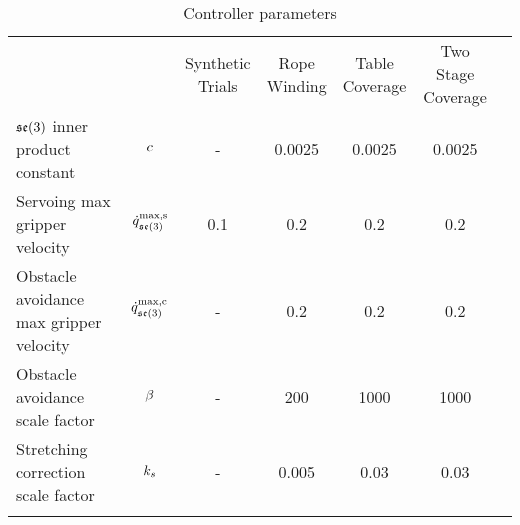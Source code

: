 \begin{table}[h]
\centering
\caption{Controller parameters}
\label{tab:controller_param_table}
\begin{tabular}{lcccccc}
\hline\noalign{\smallskip}
                                                        &                       & \makecell{Synthetic\\Trials} 
                                                                                & \makecell{Rope\\Winding}
                                                                                & \makecell{Table\\Coverage}
                                                                                & \makecell{Two Stage\\Coverage} \\
\noalign{\smallskip}\hline\noalign{\smallskip}
\makecell[l]{$\mathfrak{se}(3)$ inner\\product constant}      & $c$        &   - & 0.0025 & 0.0025 & 0.0025 \\
\noalign{\smallskip}
\makecell[l]{Servoing max\\gripper velocity}           & $\dot{q}^\textrm{max,s}_{\mathfrak{se}(3)}$  & 0.1 &    0.2 &    0.2 &    0.2 \\
\noalign{\smallskip}
\makecell[l]{Obstacle avoidance\\max gripper velocity} & $\dot{q}^\textrm{max,c}_{\mathfrak{se}(3)}$    &   - &    0.2 &    0.2 &    0.2 \\
\noalign{\smallskip}
\makecell[l]{Obstacle avoidance\\scale factor}         & $\beta$      &   - &    200 &   1000 &   1000 \\
\noalign{\smallskip}
\makecell[l]{Stretching correction\\scale factor}      & $k_s$ &   - &  0.005 &   0.03 &   0.03 \\
\noalign{\smallskip}\hline
\end{tabular}

\end{table}
